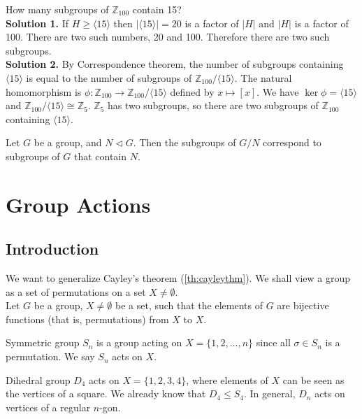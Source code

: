 \documentclass[12pt]{article}
\newcommand{\Z}{\mathbb{Z}}
\begin{document}
	\begin{myex}{}{}
		How many subgroups of $\Z_{100}$ contain 15?\\
		
		\textbf{Solution 1.} If $H\geq\langle 15\rangle$ then $|\langle 15\rangle|=20$ is a factor of $|H|$ and $|H|$ is a factor of 100. There are two such numbers, 20 and 100. Therefore there are two such subgroups.\\
		
		\textbf{Solution 2.} By Correspondence theorem, the number of subgroups containing $\langle 15\rangle$ is equal to the number of subgroups of $\Z_{100}/\langle 15\rangle$. The natural homomorphism is $\phi:\Z_{100}\to\Z_{100}/\langle 15\rangle$ defined by $x\mapsto[x]$. We have $\ker\phi=\langle 15\rangle$ and $\Z_{100}/\langle 15\rangle\cong\Z_5$. $\Z_5$ has two subgroups, so there are two subgroups of $\Z_{100}$ containing $\langle 15\rangle$.
	\end{myex}
	
	\begin{mycor}{}{}
		Let $G$ be a group, and $N\lhd G$. Then the subgroups of $G/N$ correspond to subgroups of $G$ that contain $N$.
	\end{mycor}
	
	\section{Group Actions}
	\subsection{Introduction}
	
	\begin{myrem}{}{}
		We want to generalize Cayley's theorem (\ref{th:cayleythm}). We shall view a group as a set of permutations on a set $X\neq\emptyset$.\\
		
		Let $G$ be a group, $X\neq\emptyset$ be a set, such that the elements of $G$ are bijective functions (that is, permutations) from $X$ to $X$.
	\end{myrem}
	
	\begin{myex}{Symmetric group}{}
		$S_n$ is a group acting on $X=\{1, 2, \dots, n\}$ since all $\sigma\in S_n$ is a permutation. We say $S_n$ acts on $X$.
	\end{myex}
	
	\begin{myex}{Dihedral group}{}
		$D_4$ acts on $X=\{1, 2, 3, 4\}$, where elements of $X$ can be seen as the vertices of a square. We already know that $D_4\leq S_4$. In general, $D_n$ acts on vertices of a regular $n$-gon.
	\end{myex}
	
\end{document}
